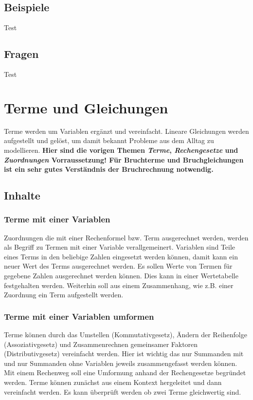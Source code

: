 \documentclass{article}
\begin{document}
\subsection{Beispiele}
\begin{tcolorbox}[colback=gray!5!white,colframe=gray!25!black]
Test
\end{tcolorbox}
\subsection{Fragen}
\begin{tcolorbox}[colback=blue!5!white,colframe=blue!25!black]
Test
\end{tcolorbox}
\newpage

\section{Terme und Gleichungen}
Terme werden um Variablen ergänzt und vereinfacht. Lineare Gleichungen werden aufgestellt und gelöst, um damit bekannt Probleme aus dem Alltag zu modellieren.
\textbf{Hier sind die vorigen Themen \textit{Terme}, \textit{Rechengesetze} und \textit{Zuordnungen} Vorraussetzung! Für Bruchterme und Bruchgleichungen ist ein sehr gutes Verständnis der Bruchrechnung notwendig.}
\subsection{Inhalte}
\subsubsection*{Terme mit einer Variablen}
Zuordnungen die mit einer Rechenformel bzw. Term ausgerechnet werden, werden als Begriff zu Termen mit einer Variable verallgemeinert.
Variablen sind Teile eines Terms in den beliebige Zahlen eingesetzt werden können, damit kann ein neuer Wert des Terms ausgerechnet werden.
Es sollen Werte von Termen für gegebene Zahlen ausgerechnet werden können. Dies kann in einer Wertetabelle festgehalten werden.
Weiterhin soll aus einem Zusammenhang, wie z.B. einer Zuordnung ein Term aufgestellt werden.
\subsubsection*{Terme mit einer Variablen umformen}
Terme können durch das Umstellen (Kommutativgesetz), Ändern der Reihenfolge (Assoziativgesetz) und Zusammenrechnen gemeinsamer Faktoren (Distributivgesetz) vereinfacht werden.
Hier ist wichtig das nur Summanden mit und nur Summanden ohne Variablen jeweils zusammengefasst werden können. 
Mit einem Rechenweg soll eine Umformung anhand der Rechengesetze begründet werden.
Terme können zunächst aus einem Kontext hergeleitet und dann vereinfacht werden.
Es kann überprüft werden ob zwei Terme gleichwertig sind.
\end{document}
